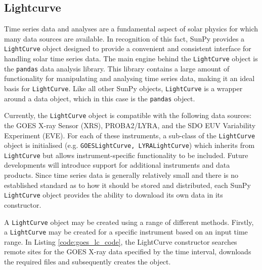 \subsection{Lightcurve}

Time series data and analyses are a fundamental aspect of solar physics 
for which many data sources are available. 
In recognition of this fact, SunPy provides a \texttt{LightCurve} object 
designed to provide a convenient and consistent interface for handling 
solar time series data. 
The main engine behind the \texttt{LightCurve} object is the \texttt{pandas} 
data analysis library. 
This library contains a large amount of functionality for manipulating 
and analysing time series data, making it an ideal basis for 
\texttt{LightCurve}.  
Like all other SunPy objects, \texttt{LightCurve} is a wrapper around 
a data object, which in this case is the \texttt{pandas} object. 

Currently, the \texttt{LightCurve} object is compatible with the following 
data sources: the GOES X-ray Sensor (XRS), PROBA2/LYRA, 
and the SDO EUV Variability Experiment (EVE). 
For each of these instruments, a sub-class of the \texttt{LightCurve} object 
is initialised (e.g. \texttt{GOESLightCurve, LYRALightCurve}) which inherits 
from \texttt{LightCurve} but allows instrument-specific functionality to be 
included. 
Future developments will introduce support for additional instruments and data 
products. 
Since time series data is generally relatively small and there is no 
established standard as to how it should be stored and distributed, 
each SunPy \texttt{LightCurve} object provides the ability to download 
its own data in its constructor.


A \texttt{LightCurve} object may be created using a range of different methods. 
Firstly, a \texttt{LightCurve} may be created for a specific instrument based 
on an input time range. In Listing \ref{code:goes_lc_code}, 
the LightCurve constructor searches remote sites for the GOES X-ray data 
specified by the time interval, downloads the required files and subsequently 
creates the object.


